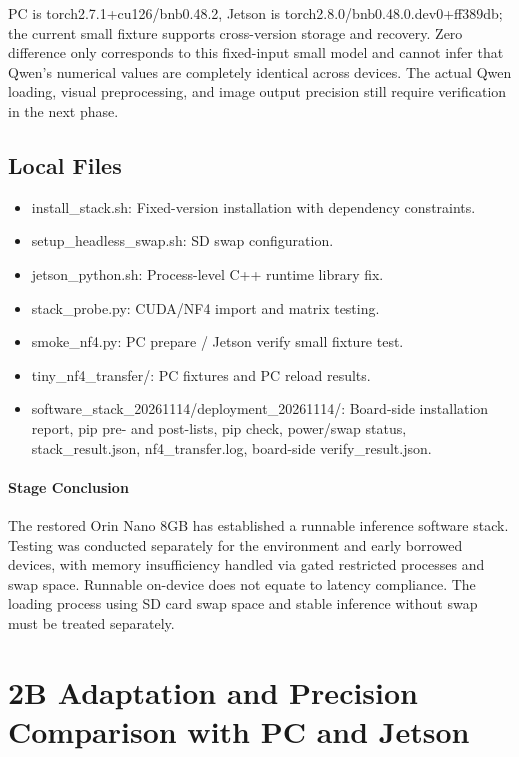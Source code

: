 PC is torch2.7.1+cu126/bnb0.48.2, Jetson is torch2.8.0/bnb0.48.0.dev0+ff389db; the current small fixture supports cross-version storage and recovery. Zero difference only corresponds to this fixed-input small model and cannot infer that Qwen's numerical values are completely identical across devices. The actual Qwen loading, visual preprocessing, and image output precision still require verification in the next phase.

\subsection{Local Files}\label{s21-detail-5}

\begin{itemize}
\tightlist
\item
  install\_stack.sh: Fixed-version installation with dependency constraints.
\item
  setup\_headless\_swap.sh: SD swap configuration.
\item
  jetson\_python.sh: Process-level C++ runtime library fix.
\item
  stack\_probe.py: CUDA/NF4 import and matrix testing.
\item
  smoke\_nf4.py: PC prepare / Jetson verify small fixture test.
\item
  tiny\_nf4\_transfer/: PC fixtures and PC reload results.
\item
  software\_stack\_20261114/deployment\_20261114/: Board-side installation report, pip pre- and post-lists, pip check, power/swap status, stack\_result.json, nf4\_transfer.log, board-side verify\_result.json.
\end{itemize}


\paragraph{Stage Conclusion} The restored Orin Nano 8GB has established a runnable inference software stack. Testing was conducted separately for the environment and early borrowed devices, with memory insufficiency handled via gated restricted processes and swap space. Runnable on-device does not equate to latency compliance. The loading process using SD card swap space and stable inference without swap must be treated separately.


\FloatBarrier

\section{2B Adaptation and Precision Comparison with PC and Jetson}

